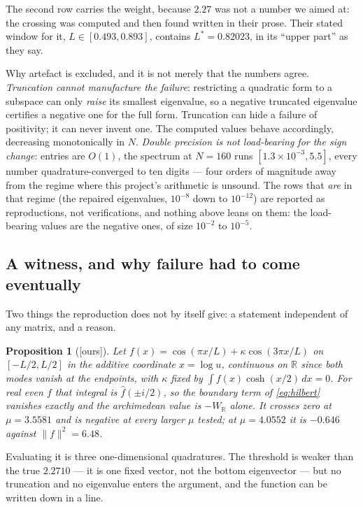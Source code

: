 \documentclass[11pt,a4paper]{article}
\theoremstyle{plain}
\newtheorem{proposition}[theorem]{Proposition}
\theoremstyle{definition}
\theoremstyle{remark}
\newcommand{\ours}{{\normalfont\sffamily\footnotesize[ours]}}
\newcommand{\R}{\mathbb{R}}
\begin{document}
The second row carries the weight, because $2.27$ was not a number we aimed at:
the crossing was computed and then found written in their prose.  Their stated
window for it, $L\in[0.493,0.893]$, contains $L^*=0.82023$, in its ``upper
part'' as they say.

Why artefact is excluded, and it is not merely that the numbers agree.
\emph{Truncation cannot manufacture the failure}: restricting a quadratic form
to a subspace can only \emph{raise} its smallest eigenvalue, so a negative
truncated eigenvalue certifies a negative one for the full form.  Truncation can
hide a failure of positivity; it can never invent one.  The computed values
behave accordingly, decreasing monotonically in $N$.  \emph{Double precision is
not load-bearing for the sign change}: entries are $O(1)$, the spectrum at
$N=160$ runs $[1.3\times10^{-3},5.5]$, every number quadrature-converged to ten
digits --- four orders of magnitude away from the regime where this project's
arithmetic is unsound.  The rows that \emph{are} in that regime (the repaired
eigenvalues, $10^{-8}$ down to $10^{-12}$) are reported as reproductions, not
verifications, and nothing above leans on them: the load-bearing values are the
negative ones, of size $10^{-2}$ to $10^{-5}$.

\subsection{A witness, and why failure had to come eventually}
\label{sec:witness}

Two things the reproduction does not by itself give: a statement independent of
any matrix, and a reason.

\begin{proposition}[\ours]\label{prop:witness}
Let $f(x)=\cos(\pi x/L)+\kappa\cos(3\pi x/L)$ on $[-L/2,L/2]$ in the additive
coordinate $x=\log u$, continuous on $\R$ since both modes vanish at the
endpoints, with $\kappa$ fixed by $\int f(x)\cosh(x/2)\,dx=0$.  For real even $f$
that integral is $\widehat f(\pm i/2)$, so the boundary term of
\eqref{eq:hilbert} vanishes exactly and the archimedean value is $-W_\R$ alone.
It crosses zero at $\mu=3.5581$ and is negative at every larger $\mu$ tested;
at $\mu=4.0552$ it is $-0.646$ against $\|f\|^2=6.48$.
\end{proposition}

Evaluating it is three one-dimensional quadratures.  The threshold is weaker
than the true $2.2710$ --- it is one fixed vector, not the bottom eigenvector ---
but no truncation and no eigenvalue enters the argument, and the function can be
written down in a line.
\end{document}
